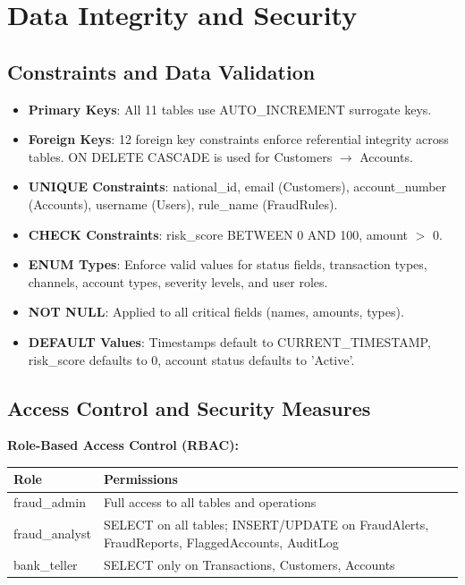 \documentclass[a4paper,12pt]{article}
\begin{document}
\section{Data Integrity and Security}

\subsection{Constraints and Data Validation}
\begin{itemize}
    \item \textbf{Primary Keys}: All 11 tables use AUTO\_INCREMENT surrogate keys.
    \item \textbf{Foreign Keys}: 12 foreign key constraints enforce referential integrity across tables. ON DELETE CASCADE is used for Customers $\rightarrow$ Accounts.
    \item \textbf{UNIQUE Constraints}: national\_id, email (Customers), account\_number (Accounts), username (Users), rule\_name (FraudRules).
    \item \textbf{CHECK Constraints}: risk\_score BETWEEN 0 AND 100, amount $>$ 0.
    \item \textbf{ENUM Types}: Enforce valid values for status fields, transaction types, channels, account types, severity levels, and user roles.
    \item \textbf{NOT NULL}: Applied to all critical fields (names, amounts, types).
    \item \textbf{DEFAULT Values}: Timestamps default to CURRENT\_TIMESTAMP, risk\_score defaults to 0, account status defaults to 'Active'.
\end{itemize}

\subsection{Access Control and Security Measures}
\textbf{Role-Based Access Control (RBAC):}
\begin{longtable}{|l|p{8cm}|}
\hline
\textbf{Role} & \textbf{Permissions} \\
\hline
fraud\_admin & Full access to all tables and operations \\
\hline
fraud\_analyst & SELECT on all tables; INSERT/UPDATE on FraudAlerts, FraudReports, FlaggedAccounts, AuditLog \\
\hline
bank\_teller & SELECT only on Transactions, Customers, Accounts \\
\hline
\end{longtable}
\end{document}
